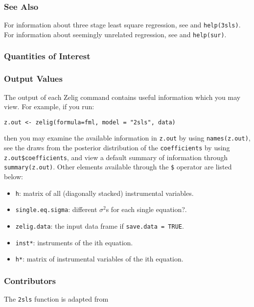 \subsubsection{See Also}
For information about three stage least square regression, see 
 and \texttt{help(3sls)}.
For information about seemingly unrelated regression, see
 and \texttt{help(sur)}.
\subsubsection{Quantities of Interest}
\subsubsection{Output Values}
The output of each Zelig command contains useful information which you may
view. For example, if you run:
\begin{verbatim}
z.out <- zelig(formula=fml, model = "2sls", data)
\end{verbatim}
\noindent then you may examine the available information in \texttt{z.out} by
using \texttt{names(z.out)}, see the draws from the posterior distribution of
the \texttt{coefficients} by using \texttt{z.out\$coefficients}, and view a default
summary of information through \texttt{summary(z.out)}. Other elements
available through the \texttt{\$} operator are listed below:
\begin{itemize}
\item \texttt{h}: matrix of all (diagonally stacked) instrumental variables.
\item \texttt{single.eq.sigma}: different $\sigma^2$s for each single equation?.
   \item {\tt zelig.data}: the input data frame if {\tt save.data = TRUE}.  
\end{itemize}



\begin{itemize}
\item \texttt{inst*}: instruments of the ith equation.
\item \texttt{h*}: matrix of instrumental variables of the ith equation. 
\end{itemize}
\subsubsection{Contributors}
The \texttt{2sls} function is adapted from 


